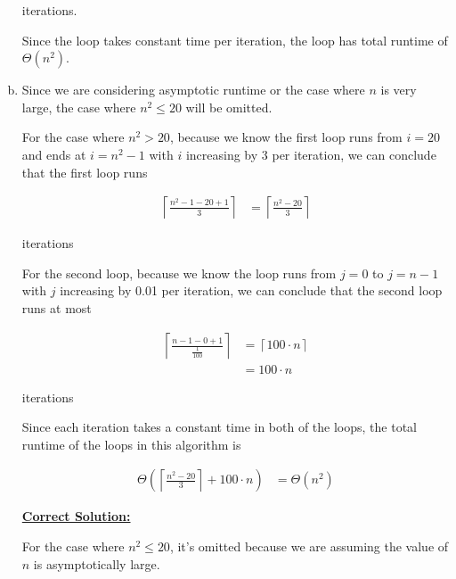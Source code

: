 \documentclass[12pt]{article}
\begin{document}
\begin{enumerate}[a.]
    iterations.

    \bigskip

    Since the loop takes constant time per iteration, the loop has total runtime
    of $\Theta(n^2)$.

    \item

    Since we are considering asymptotic runtime or the case where $n$ is very large,
    the case where $n^2 \leq 20$ will be omitted.

    \bigskip

    For the case where $n^2 > 20$, because we know the first loop runs from $i = 20$
    and ends at $i = n^2 - 1$ with $i$ increasing by 3 per iteration, we can conclude
    that the first loop runs

    \setcounter{equation}{0}
    \begin{align}
        \left\lceil \frac{n^2 -1 - 20 + 1}{3} \right\rceil &= \left\lceil \frac{n^2 - 20}{3} \right\rceil
    \end{align}

    iterations

    \bigskip

    For the second loop, because we know the loop runs from $j = 0$ to $j = n-1$
    with $j$ increasing by 0.01 per iteration, we can conclude that the second loop
    runs at most

    \begin{align}
        \left\lceil \frac{n - 1 - 0 + 1}{\frac{1}{100}} \right\rceil &= \left\lceil 100 \cdot n \right\rceil\\
        &= 100 \cdot n
    \end{align}

    iterations

    \bigskip

    Since each iteration takes a constant time in both of the loops, the total
    runtime of the loops in this algorithm is

    \begin{align}
        \Theta \left( \left\lceil \frac{n^2 - 20}{3} \right\rceil + 100 \cdot n \right) &= \Theta(n^2)
    \end{align}

    \begin{mdframed}
        \underline{\textbf{Correct Solution:}}

        \bigskip

        For the case where $n^2 \leq 20$, it's omitted because we are assuming the
        value of $n$ is asymptotically large.


\end{mdframed}
\end{enumerate}
\end{document}
